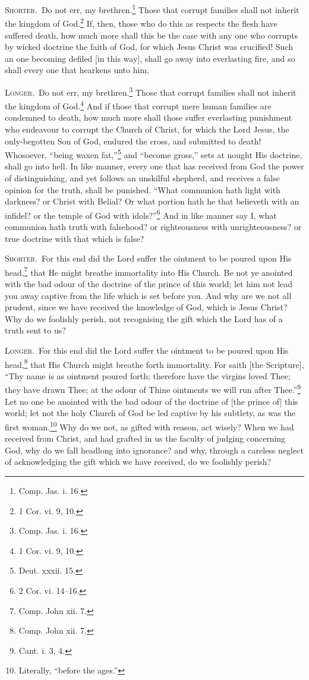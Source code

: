 
\textsc{Shorter.}~Do not err, my brethren.\footnote{Comp. Jas. i. 16.} Those that corrupt families shall not inherit the kingdom of God.\footnote{1 Cor. vi. 9, 10.} If, then, those who do this as respects the flesh have suffered death, how much more shall this be the case with any one who corrupts by wicked doctrine the faith of God, for which Jesus Christ was crucified! Such an one becoming defiled [in this way], shall go away into everlasting fire, and so shall every one that hearkens unto him.

\textsc{Longer.}~Do not err, my brethren.\footnote{Comp. Jas. i. 16.} Those that corrupt families shall not inherit the kingdom of God.\footnote{1 Cor. vi. 9, 10.} And if those that corrupt mere human families are condemned to death, how much more shall those suffer everlasting punishment who endeavour to corrupt the Church of Christ, for which the Lord Jesus, the only-begotten Son of God, endured the cross, and submitted to death! Whosoever, “being waxen fat,”\footnote{Deut. xxxii. 15.} and “become gross,” sets at nought His doctrine, shall go into hell. In like manner, every one that has received from God the power of distinguishing, and yet follows an unskilful shepherd, and receives a false opinion for the truth, shall be punished. “What communion hath light with darkness? or Christ with Belial? Or what portion hath he that believeth with an infidel? or the temple of God with idols?”\footnote{2 Cor. vi. 14–16.} And in like manner say I, what communion hath truth with falsehood? or righteousness with unrighteousness? or true doctrine with that which is false?


\textsc{Shorter.}~For this end did the Lord suffer the ointment to be poured upon His head,\footnote{Comp. John xii. 7.} that He might breathe immortality into His Church. Be not ye anointed with the bad odour of the doctrine of the prince of this world; let him not lead you away captive from the life which is set before you. And why are we not all prudent, since we have received the knowledge of God, which is Jesus Christ? Why do we foolishly perish, not recognising the gift which the Lord has of a truth sent to us?

\textsc{Longer.}~For this end did the Lord suffer the ointment to be poured upon His head,\footnote{Comp. John xii. 7.} that His Church might breathe forth immortality. For saith [the Scripture], “Thy name is as ointment poured forth; therefore have the virgins loved Thee; they have drawn Thee; at the odour of Thine ointments we will run after Thee.”\footnote{Cant. i. 3, 4.} Let no one be anointed with the bad odour of the doctrine of [the prince of] this world; let not the holy Church of God be led captive by his subtlety, as was the first woman.\footnote{Literally, “before the ages.”} Why do we not, as gifted with reason, act wisely? When we had received from Christ, and had grafted in us the faculty of judging concerning God, why do we fall headlong into ignorance? and why, through a careless neglect of acknowledging the gift which we have received, do we foolishly perish?

